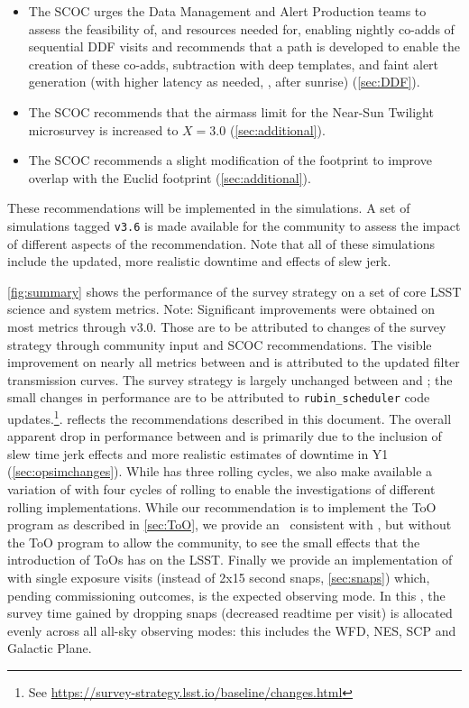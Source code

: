 \begin{itemize}
\item The SCOC urges the Data Management and Alert Production teams to assess the feasibility of, and resources needed for, enabling nightly co-adds of sequential DDF visits and recommends that a path is developed to enable the creation of these co-adds, subtraction with deep templates, and faint alert generation (with higher latency as needed, \eg , after sunrise) (\autoref{sec:DDF}). 

\item The SCOC recommends that the airmass limit for the Near-Sun Twilight microsurvey is increased to $X=3.0$ (\autoref{sec:additional}).

\item The SCOC recommends a slight modification of the  footprint to improve overlap with the Euclid footprint (\autoref{sec:additional}). 

\end{itemize}

These recommendations will be implemented in the  simulations. A set of simulations tagged \texttt{v3.6} is made available for the community to assess the impact of different aspects of the recommendation. Note that all of these simulations include the updated, more realistic downtime and effects of slew jerk. 

 \autoref{fig:summary} shows the performance of the survey strategy on a set of core LSST science and system metrics. Note: Significant improvements were obtained on most metrics through v3.0. Those are to be attributed to changes of the survey strategy through community input and SCOC recommendations. The visible improvement on nearly all metrics between  and  is attributed to the updated filter transmission curves. The survey strategy is largely unchanged between  and ; the small changes in performance are to be attributed to  \texttt{rubin\_scheduler} code updates.\footnote{See \url{https://survey-strategy.lsst.io/baseline/changes.html}}.  reflects the recommendations described in this document. The overall apparent drop in performance between  and  is primarily due to the inclusion of slew time jerk effects and more realistic estimates of downtime in Y1 (\autoref{sec:opsimchanges}). While  has three rolling cycles, we also make available a variation of  with four cycles of rolling to enable the investigations of different rolling implementations. While our recommendation is to implement the ToO program as described in \autoref{sec:ToO}, we provide an \opsim\ consistent with , but without the ToO program to allow the community, to see the small effects that the introduction of ToOs has on the LSST. Finally we provide an implementation of  with single exposure visits (instead of 2x15 second snaps, \autoref{sec:snaps}) which, pending commissioning outcomes, is the expected observing mode. In this \opsim, the survey time gained by dropping snaps (decreased readtime per visit) is allocated evenly across all all-sky observing modes: this includes the WFD, NES, SCP and Galactic Plane.


